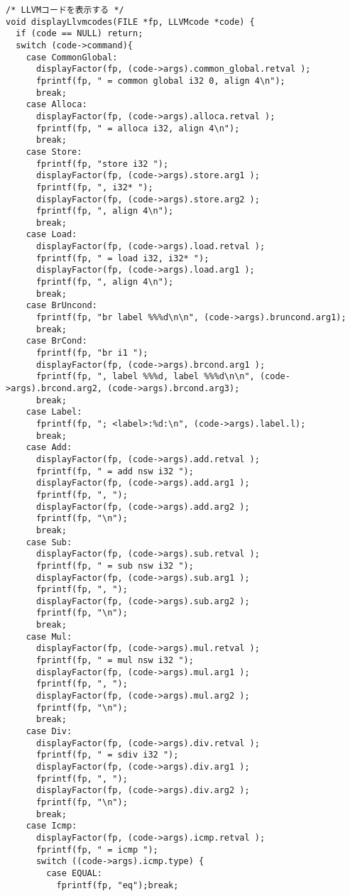 \documentclass[uplatex]{jsarticle}
\begin{document}
\begin{lstlisting}[caption=displayLlvmcodes関数の定義,label=lst:ex5:llvm.c:displayLlvmcodes]
/* LLVMコードを表示する */
void displayLlvmcodes(FILE *fp, LLVMcode *code) {
  if (code == NULL) return;
  switch (code->command){
    case CommonGlobal:
      displayFactor(fp, (code->args).common_global.retval );
      fprintf(fp, " = common global i32 0, align 4\n");
      break;
    case Alloca:
      displayFactor(fp, (code->args).alloca.retval );
      fprintf(fp, " = alloca i32, align 4\n");
      break;
    case Store:
      fprintf(fp, "store i32 ");
      displayFactor(fp, (code->args).store.arg1 );
      fprintf(fp, ", i32* ");
      displayFactor(fp, (code->args).store.arg2 );
      fprintf(fp, ", align 4\n");
      break;
    case Load:
      displayFactor(fp, (code->args).load.retval );
      fprintf(fp, " = load i32, i32* ");
      displayFactor(fp, (code->args).load.arg1 );
      fprintf(fp, ", align 4\n");
      break;
    case BrUncond:
      fprintf(fp, "br label %%%d\n\n", (code->args).bruncond.arg1);
      break;
    case BrCond:
      fprintf(fp, "br i1 ");
      displayFactor(fp, (code->args).brcond.arg1 );
      fprintf(fp, ", label %%%d, label %%%d\n\n", (code->args).brcond.arg2, (code->args).brcond.arg3);
      break;
    case Label:
      fprintf(fp, "; <label>:%d:\n", (code->args).label.l);
      break;
    case Add:
      displayFactor(fp, (code->args).add.retval );
      fprintf(fp, " = add nsw i32 ");
      displayFactor(fp, (code->args).add.arg1 );
      fprintf(fp, ", ");
      displayFactor(fp, (code->args).add.arg2 );
      fprintf(fp, "\n");
      break;
    case Sub:
      displayFactor(fp, (code->args).sub.retval );
      fprintf(fp, " = sub nsw i32 ");
      displayFactor(fp, (code->args).sub.arg1 );
      fprintf(fp, ", ");
      displayFactor(fp, (code->args).sub.arg2 );
      fprintf(fp, "\n");
      break;
    case Mul:
      displayFactor(fp, (code->args).mul.retval );
      fprintf(fp, " = mul nsw i32 ");
      displayFactor(fp, (code->args).mul.arg1 );
      fprintf(fp, ", ");
      displayFactor(fp, (code->args).mul.arg2 );
      fprintf(fp, "\n");
      break;
    case Div:
      displayFactor(fp, (code->args).div.retval );
      fprintf(fp, " = sdiv i32 ");
      displayFactor(fp, (code->args).div.arg1 );
      fprintf(fp, ", ");
      displayFactor(fp, (code->args).div.arg2 );
      fprintf(fp, "\n");
      break;
    case Icmp:
      displayFactor(fp, (code->args).icmp.retval );
      fprintf(fp, " = icmp ");
      switch ((code->args).icmp.type) {
        case EQUAL:
          fprintf(fp, "eq");break;

\end{lstlisting}
\end{document}
